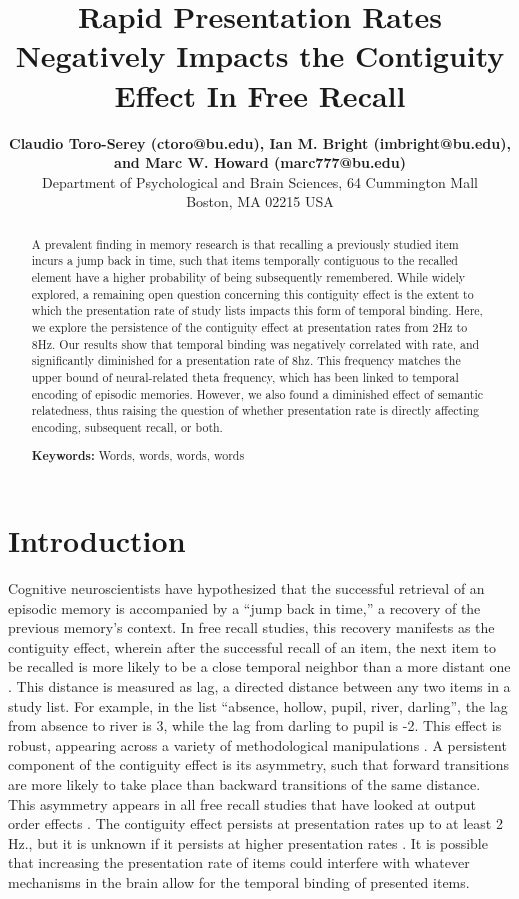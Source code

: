 \documentclass[10pt,letterpaper]{article}
\title{Rapid Presentation Rates Negatively Impacts the Contiguity Effect In Free Recall}
\author{{\large \bf Claudio Toro-Serey (ctoro@bu.edu), Ian M. Bright (imbright@bu.edu), and Marc W. Howard (marc777@bu.edu)} \\
  Department of Psychological and Brain Sciences, 64 Cummington Mall\\
  Boston, MA 02215 USA}
\begin{document}
\maketitle


\begin{abstract}
A prevalent finding in memory research is that recalling a previously studied item incurs a jump back in time, such that items temporally contiguous to the recalled element have a higher probability of being subsequently remembered. While widely explored, a remaining open question concerning this contiguity effect is the extent to which the presentation rate of study lists impacts this form of temporal binding. Here, we explore the persistence of the contiguity effect at presentation rates from 2Hz to 8Hz. Our results show that temporal binding was negatively correlated with rate, and significantly diminished for a presentation rate of 8hz. This frequency matches the upper bound of neural-related theta frequency, which has been linked to temporal encoding of episodic memories. However, we also found a diminished effect of semantic relatedness, thus raising the question of whether presentation rate is directly affecting encoding, subsequent recall, or both.

\textbf{Keywords:} 
Words, words, words, words
\end{abstract}

\section{Introduction}

Cognitive neuroscientists have hypothesized that the successful retrieval of an episodic memory is accompanied by a ``jump back in time,'' a recovery of the previous memory's context. \cite{Tulv83}
In free recall studies, this recovery manifests as the contiguity effect, wherein after the successful recall of an item, the next item to be recalled is more likely to be a close temporal neighbor than a more distant one \cite{Kaha96}. 
This distance is measured as lag, a directed distance between any two items in a study list. For example, in the list ``absence, hollow, pupil, river, darling'', the lag from absence to river is 3, while the lag from darling to pupil is -2. 
This effect is robust, appearing across a variety of methodological manipulations \cite{Kaha12}. 
A persistent component of the contiguity effect is its asymmetry, such that forward transitions are more likely to take place than backward transitions of the same distance. 
This asymmetry appears in all free recall studies that have looked at output order effects \cite{KahaEtal08}. 
The contiguity effect persists at presentation rates up to at least 2 Hz., but it is unknown if it persists at higher presentation rates \cite{Kaha96}. 
It is possible that increasing the presentation rate of items could interfere with whatever mechanisms in the brain allow for the temporal binding of presented items. 
\end{document}
